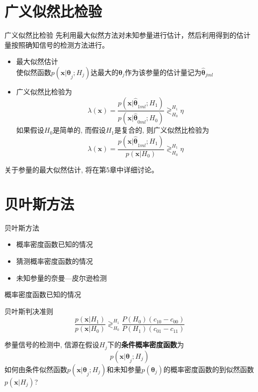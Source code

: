 \section{广义似然比检验}

\begin{frame}[shrink]{广义似然比检验}
先利用最大似然方法对未知参量进行估计，然后利用得到的估计量按照确知信号的检测方法进行。
\begin{itemize}
	\setlength{\itemsep}{.2cm}
	\item 最大似然估计\\
	使似然函数$p(\bm{x|\theta}_j; H_j)$达最大的$\bm{\theta}_j$作为该参量的估计量记为$\bm{\hat{\theta}}_{jml}$
	\item 广义似然比检验为
	\[\lambda(\bm{x})=\frac{p(\bm{x|\hat{\theta}}_{1ml}; H_1)}{p(\bm{x|\hat{\theta}}_{0ml}; H_0)}\mathop{\gtrless}_{H_0}^{H_1}\eta \]
	如果假设$H_0$是简单的, 而假设$H_1$是复合的, 则广义似然比检验为
	\[\lambda(\bm{x})=\frac{p(\bm{x|\hat{\theta}}_{1ml}; H_1)}{p(\bm{x}|H_0)}\mathop{\gtrless}_{H_0}^{H_1}\eta \]
\end{itemize}
关于参量的最大似然估计, 将在第5章中详细讨论。
\end{frame}

\section{贝叶斯方法}

\begin{frame}{贝叶斯方法}
\begin{itemize}
	\setlength{\itemsep}{.5cm}
	\item 概率密度函数已知的情况
	\item 猜测概率密度函数的情况
	\item 未知参量的奈曼---皮尔逊检测	
\end{itemize}
\end{frame}

\begin{frame}[shrink]{概率密度函数已知的情况}
\begin{block}{贝叶斯判决准则}
	\[ \frac{p(\bm{x}|H_1)}{p(\bm{x}|H_0)}\mathop{\gtrless}_{H_0}^{H_1}\frac{P(H_0)(c_{10}-c_{00})}{P(H_1)(c_{01}-c_{11})} \]
\end{block}
参量信号的检测中, 信源在假设$H_j$下的\textbf{条件概率密度函数}为
\[ p(\bm{x|\theta}_j; H_j)\]
如何由条件似然函数$p(\bm{x|\theta}_j; H_j)$和未知参量$p(\bm{\theta}_j)$的概率密度函数的到似然函数$p(\bm{x}|H_j)$?
\end{frame}

